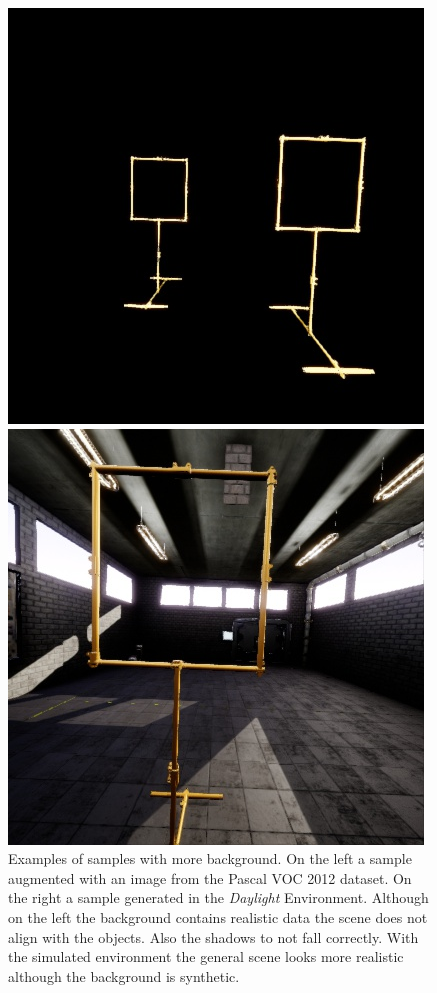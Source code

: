 \begin{figure}[hbtp]
\begin{minipage}{0.3\textwidth}
	\includegraphics[width=\textwidth]{fig/void}
	\end{minipage}
	\begin{minipage}{0.3\textwidth}
		\includegraphics[width=\textwidth]{fig/sim}
	\end{minipage}
	\caption{Examples of samples with more background. On the left a sample augmented with an image from the Pascal VOC 2012 dataset. On the right a sample generated in the \textit{Daylight} Environment. Although on the left the background contains realistic data the scene does not align with the objects. Also the shadows to not fall correctly. With the simulated environment the general scene looks more realistic although the background is synthetic.}
	\label{fig:sim_vs_voc}
\end{figure}


